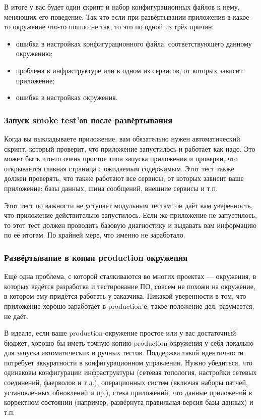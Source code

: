 \documentclass{../../text-style}
\begin{document}
В итоге у вас будет один скрипт и набор конфигурационных файлов к нему, меняющих его поведение. Так что если при развёртывании приложения в какое-то окружение что-то пошло не так, то это по одной из трёх причин:

\begin{itemize}
    \item ошибка в настройках конфигурационного файла, соответствующего данному окружению;
    \item проблема в инфраструктуре или в одном из сервисов, от которых зависит приложение;
    \item ошибка в настройках окружения.
\end{itemize}

\subsubsection{Запуск smoke test’ов после развёртывания}

Когда вы выкладываете приложение, вам обязательно нужен автоматический скрипт, который проверит, что приложение запустилось и работает как надо. Это может быть что-то очень простое типа запуска приложения и проверки, что открывается главная страница с ожидаемым содержимым. Этот тест также должен проверять, что также работают все сервисы, от которых зависит ваше приложение: базы данных, шина сообщений, внешние сервисы и т.п.

Этот тест по важности не уступает модульным тестам: он даёт вам уверенность, что приложение действительно запустилось. Если же приложение не запустилось, то этот тест должен проводить базовую диагностику и выдавать вам информацию по её итогам. По крайней мере, что именно не заработало.

\subsubsection{Развёртывание в копии production окружения}

Ещё одна проблема, с которой сталкиваются во многих проектах --- окружения, в которых ведётся разработка и тестирование ПО, совсем не похожи на окружение, в котором ему придётся работать у заказчика. Никакой уверенности в том, что приложение хорошо заработает в production’е, такое положение дел, разумеется, не даёт.

В идеале, если ваше production-окружение простое или у вас достаточный бюджет, хорошо бы иметь точную копию production-окружения у себя локально для запуска автоматических и ручных тестов. Поддержка такой идентичности потребует аккуратности в конфигурационном управлении. Нужно убедиться, что одинаковы конфигурации инфраструктуры (сетевая топология, настройки сетевых соединений, фаерволов и т.д.), операционных систем (включая наборы патчей, установленных обновлений и пр.), стека приложений, что данные приложений в корректном состоянии (например, развёрнута правильная версия базы данных) и т.п.
\end{document}
